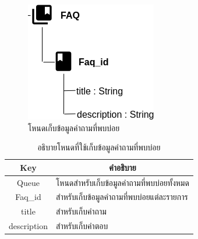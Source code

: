 \newpagedr
\begin{figure}[H]
	\centering
	\includegraphics[width=0.4\columnwidth]
	{Figures/3/DB/nodeFaq}
	\caption{โหนดเก็บข้อมูลคำถามที่พบบ่อย}
	\label{Fig:DB4}
\end{figure}
\begin{table}[H]
	\centering
	\caption{อธิบายโหนดที่ใช้เก็บข้อมูลคำถามที่พบบ่อย}
	\label{my-label1}
	\begin{tabular}{|c|p{10cm}|}
		\hline
		\multicolumn{1}{|c|}{\textbf{Key}} & \multicolumn{1}{c|}{\textbf{คำอธิบาย}} \\ \hline
		Queue & โหนดสำหรับเก็บข้อมูลคำถามที่พบบ่อยทั้งหมด \\ \hline
		Faq\_id & สำหรับเก็บข้อมูลคำถามที่พบบ่อยแต่ละรายการ \\ \hline
		title & สำหรับเก็บคำถาม \\ \hline
		description & สำหรับเก็บคำตอบ \\ \hline
	\end{tabular}
\end{table}
